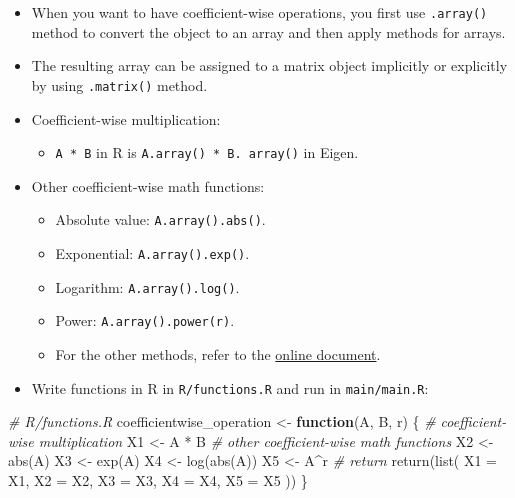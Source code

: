\documentclass[
]{book}
\newenvironment{Shaded}{\begin{snugshade}}{\end{snugshade}}
\newcommand{\AttributeTok}[1]{\textcolor[rgb]{0.77,0.63,0.00}{#1}}
\newcommand{\CommentTok}[1]{\textcolor[rgb]{0.56,0.35,0.01}{\textit{#1}}}
\newcommand{\ControlFlowTok}[1]{\textcolor[rgb]{0.13,0.29,0.53}{\textbf{#1}}}
\newcommand{\FunctionTok}[1]{\textcolor[rgb]{0.00,0.00,0.00}{#1}}
\newcommand{\NormalTok}[1]{#1}
\newcommand{\OtherTok}[1]{\textcolor[rgb]{0.56,0.35,0.01}{#1}}
\newcommand{\SpecialCharTok}[1]{\textcolor[rgb]{0.00,0.00,0.00}{#1}}
\providecommand{\tightlist}{%
  \setlength{\itemsep}{0pt}\setlength{\parskip}{0pt}}
\begin{document}
\begin{itemize}
\item
  When you want to have coefficient-wise operations, you first use \texttt{.array()} method to convert the object to an array and then apply methods for arrays.
\item
  The resulting array can be assigned to a matrix object implicitly or explicitly by using \texttt{.matrix()} method.
\item
  Coefficient-wise multiplication:

  \begin{itemize}
  \tightlist
  \item
    \texttt{A\ *\ B} in R is \texttt{A.array()\ *\ B.\ array()} in Eigen.
  \end{itemize}
\item
  Other coefficient-wise math functions:

  \begin{itemize}
  \tightlist
  \item
    Absolute value: \texttt{A.array().abs()}.
  \item
    Exponential: \texttt{A.array().exp()}.
  \item
    Logarithm: \texttt{A.array().log()}.
  \item
    Power: \texttt{A.array().power(r)}.
  \item
    For the other methods, refer to the \href{https://eigen.tuxfamily.org/dox/group__CoeffwiseMathFunctions.html}{online document}.
  \end{itemize}
\item
  Write functions in R in \texttt{R/functions.R} and run in \texttt{main/main.R}:
\end{itemize}

\begin{Shaded}
\begin{Highlighting}[]
\CommentTok{\# R/functions.R}
\NormalTok{coefficientwise\_operation }\OtherTok{\textless{}{-}}
  \ControlFlowTok{function}\NormalTok{(A, B, r) \{}
    \CommentTok{\# coefficient{-}wise multiplication}
\NormalTok{    X1 }\OtherTok{\textless{}{-}}\NormalTok{ A }\SpecialCharTok{*}\NormalTok{ B}
    \CommentTok{\# other coefficient{-}wise math functions}
\NormalTok{    X2 }\OtherTok{\textless{}{-}} \FunctionTok{abs}\NormalTok{(A)}
\NormalTok{    X3 }\OtherTok{\textless{}{-}} \FunctionTok{exp}\NormalTok{(A)}
\NormalTok{    X4 }\OtherTok{\textless{}{-}} \FunctionTok{log}\NormalTok{(}\FunctionTok{abs}\NormalTok{(A))}
\NormalTok{    X5 }\OtherTok{\textless{}{-}}\NormalTok{ A}\SpecialCharTok{\^{}}\NormalTok{r}
    \CommentTok{\# return}
    \FunctionTok{return}\NormalTok{(}\FunctionTok{list}\NormalTok{(}
      \AttributeTok{X1 =}\NormalTok{ X1,}
      \AttributeTok{X2 =}\NormalTok{ X2,}
      \AttributeTok{X3 =}\NormalTok{ X3,}
      \AttributeTok{X4 =}\NormalTok{ X4,}
      \AttributeTok{X5 =}\NormalTok{ X5}
\NormalTok{    ))}
\NormalTok{  \}}
\end{Highlighting}
\end{Shaded}
\end{document}
